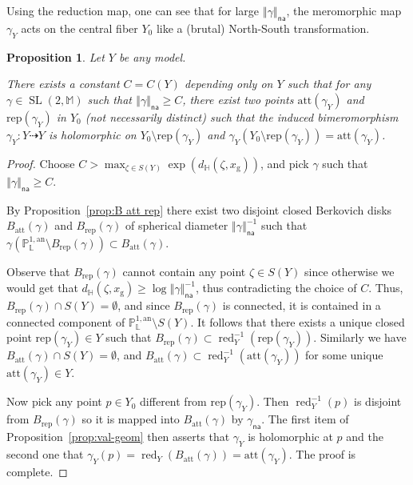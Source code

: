 \documentclass[11pt]{article}
\newtheorem{prop}[theo]{Proposition}
\theoremstyle{definition}
\numberwithin{equation}{section}
\numberwithin{figure}{section}
\numberwithin{table}{section}
\DeclareMathOperator{\red}{red}
\DeclareMathOperator{\SL}{SL}
\newcommand{\hh}{\mathbb{H}}
\newcommand{\mm}{\mathbb{M}}
\newcommand{\an}{\mathrm{an}}
\newcommand{\norm}[1]{\left\Vert#1\right\Vert}
\newcommand{\PP}{\mathbb{P}}
\newcommand{\Laurent}{\mathbb{L}}
\newcommand{\att}{\mathrm{att}}
\newcommand{\rep}{\mathrm{rep}}
\newcommand{\na}{\mathsf{na}}
\begin{document}
Using the reduction map, one can see that for large $\norm{\gamma}_\na$, the meromorphic map $\gamma_Y$ acts on the central fiber $Y_0$ like a (brutal) North-South transformation.

\begin{prop}\label{prop:nordsud}
Let $Y$ be any model.

There exists a constant $C=C(Y)$ depending only on $Y$ such that for any $\gamma \in \SL(2,\mm)$ such that $\norm{\gamma}_\na\geq C$, there exist two points $\mathrm{att}(\gamma_Y)$ and $\mathrm{rep}(\gamma_Y)$ in $Y_0$ (not necessarily distinct) such that the induced bimeromorphism $\gamma_Y: Y \dashrightarrow Y$ is holomorphic on $Y_0\setminus \mathrm{rep}(\gamma_Y)$ and $\gamma_Y(Y_0\setminus \mathrm{rep}(\gamma_Y)) = \mathrm{att}(\gamma_Y)$.
\end{prop}
\begin{proof}
Choose $C > \max_{\zeta \in S(Y)} \exp(d_\hh (\zeta, x_{\mathrm{g}}))$, and pick $\gamma$ such that $\norm{\gamma}_\na\geq C$.

By Proposition~\ref{prop:B att rep} there exist two disjoint closed Berkovich disks $B_{\att}(\gamma)$ and $B_{\rep}(\gamma)$ of spherical diameter $\norm{\gamma}^{-1}_\na$ such that $\gamma (\PP^{1,\an}_{\Laurent}\setminus B_{\rep}(\gamma)) \subset B_{\att}(\gamma)$.

Observe that $ B_{\rep}(\gamma)$ cannot contain any point $\zeta \in S(Y)$ since otherwise we would get that $d_\hh (\zeta, x_{\mathrm{g}}) \ge \log \norm{\gamma}_\na^{-1}$, thus contradicting the choice of $C$. Thus, $ B_{\rep}(\gamma) \cap S(Y) = \emptyset$, and since $B_{\rep}(\gamma)$ is connected, it is contained in a connected component of $\PP^{1,\an}_{\Laurent}\setminus S(Y)$. It follows that there exists a unique closed point $\mathrm{rep}(\gamma_Y)\in Y$ such that $B_{\rep}(\gamma) \subset \red_Y^{-1}(\mathrm{rep}(\gamma_Y))$. Similarly we have $B_{\att}(\gamma) \cap S(Y) = \emptyset$, and $B_{\att}(\gamma)\subset \red_Y^{-1}(\mathrm{att}(\gamma_Y))$ for some unique $\mathrm{att}(\gamma_Y)\in Y$.

Now pick any point $p \in Y_0$ different from $\mathrm{rep}(\gamma_Y)$. Then $\red_Y^{-1}(p)$ is disjoint from $B_{\rep}(\gamma)$ so it is mapped into $B_{\att}(\gamma)$ by $\gamma_\na$. The first item of Proposition~\ref{prop:val-geom} then asserts that $\gamma_{Y}$ is holomorphic at $p$ and the second one that $\gamma_{Y}(p) =\red_Y(B_{\att}(\gamma)) = \mathrm{att}(\gamma_Y)$. The proof is complete.
\end{proof}
\end{document}
